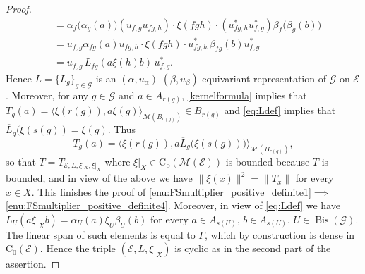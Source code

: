 \documentclass[10pt,a4paper]{amsart}
\DeclareMathOperator{\Bis}{Bis}
\newcommand{\EE}{\mathcal E}
\newcommand{\G}{\mathcal G} %
\newcommand{\M}{\mathcal M}
\newcommand*{\contb}{\mathrm{C_b}}%
\newcommand*{\contz}{\mathrm{C_0}}%
\begin{document}
\begin{proof}
\[\begin{split}
        &= \alpha_f\big(\alpha_g(a)\big) (u_{f,g}  u_{fg,h}) \cdot \xi(fgh) \cdot (u_{fg,h}^* u_{f,g}^*) \beta_f\big(\beta_g(b)\big) \\
        &= u_{f,g}\alpha_{fg}(a)u_{fg,h}\cdot \xi(fgh) \cdot u_{fg,h}^*  \, \beta_{fg}(b) u_{f,g}^* \\
        &= u_{f,g} \, L_{fg}(a\xi(h)b) \, u_{f,g}^* . 
\end{split}
\]
Hence $L = \{ L_{g} \}_{g \in \G}$ is an $(\alpha,u_{\alpha})$-$(\beta,u_{\beta})$-equivariant representation of $\G$  on $\EE$.
Moreover, for any $g\in \G$ and $a \in A_{r(g)}$, \eqref{kernelformula} implies that $T_g(a) = \langle \xi(r(g)), a \xi(g) \rangle_{\M(B_{r(g)})}\in B_{r(g)}$ and \eqref{eq:Ldef} implies that $\overline{L}_{g}(\xi(s(g)) = \xi(g)$.
Thus
\[
    T_g(a) = \langle \xi(r(g)), a \overline{L}_g\big(\xi(s(g))\big)\rangle_{\M(B_{r(g)})}, 
\]
so that $T=T_{\EE,L,\xi|_{X},\xi|_{X}}$ where $\xi|_{X} \in \contb(\M(\EE))$ is bounded because $T$ is bounded, and in view of the above we have $\|\xi(x)\|^2=\|T_x\|$ for every $x\in X$. 
This finishes the proof of \ref{enu:FSmultiplier_positive_definite1}$\implies$\ref{enu:FSmultiplier_positive_definite4}. 
Moreover, in view of \eqref{eq:Ldef} we have $L_{U}(a\xi|_{X} b)=\alpha_{U}(a)\xi_{U}\beta_{U}(b)$ for every $a\in A_{s(U)}$, $b\in A_{s(U)}$, $U\in \Bis(\G)$. 
The linear span of such elements is equal to $\Gamma$, which by construction is dense in $\contz(\EE)$. 
Hence the triple $(\EE,L,\xi|_{X})$ is cyclic as in the second part of the assertion.


\end{proof}
\end{document}
